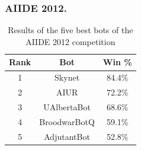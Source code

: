 \documentclass{llncs}
\begin{document}

\subsubsection*{AIIDE 2012.}

\begin{table}[!t]
\caption{Results of the five best bots of the AIIDE 2012 competition}
\label{tab:aiide2012}
\centering
\begin{tabular}{|c|c|c|}
\hline
{\bfseries Rank} & {\bfseries Bot} & {\bfseries Win \%} \\
\hline
1 & Skynet & 84.4\% \\
2 & AIUR & 72.2\% \\
3 & UAlbertaBot & 68.6\% \\
4 & BroodwarBotQ & 59.1\% \\
5 & AdjutantBot & 52.8\% \\
\hline
\end{tabular}
\end{table}
\end{document}
